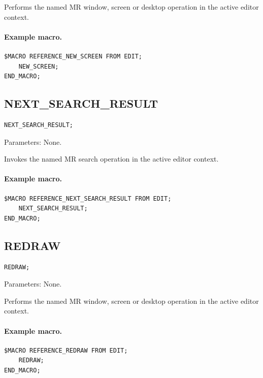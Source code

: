 \documentclass[a4paper,10pt,twoside,openany]{book}
\newenvironment{mrmacextension}{\begin{changebar}}{\end{changebar}}
\begin{document}
Performs the named MR window, screen or desktop operation in the active editor context.

\paragraph{Example macro.}
\begin{verbatim}
$MACRO REFERENCE_NEW_SCREEN FROM EDIT;
    NEW_SCREEN;
END_MACRO;
\end{verbatim}

\begin{mrmacextension}
\label{prim:procedure-next-search-result}
\subsection*{NEXT\_SEARCH\_RESULT}
\begin{verbatim}
NEXT_SEARCH_RESULT;
\end{verbatim}
Parameters: None.

Invokes the named MR search operation in the active editor context.

\paragraph{Example macro.}
\begin{verbatim}
$MACRO REFERENCE_NEXT_SEARCH_RESULT FROM EDIT;
    NEXT_SEARCH_RESULT;
END_MACRO;
\end{verbatim}
\end{mrmacextension}

\label{prim:procedure-redraw}
\subsection*{REDRAW}
\begin{verbatim}
REDRAW;
\end{verbatim}
Parameters: None.

Performs the named MR window, screen or desktop operation in the active editor context.

\paragraph{Example macro.}
\begin{verbatim}
$MACRO REFERENCE_REDRAW FROM EDIT;
    REDRAW;
END_MACRO;
\end{verbatim}
\end{document}
